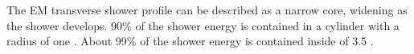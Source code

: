 The EM transverse shower profile can be described as  a narrow core,  widening as the shower develops. 90\% of the shower energy  is contained in a cylinder with a radius of one \RM. About 99\% of the shower energy  is contained inside of 3.5 \RMs \cite{PhysRev.149.201,Bathow:1970dn}.








